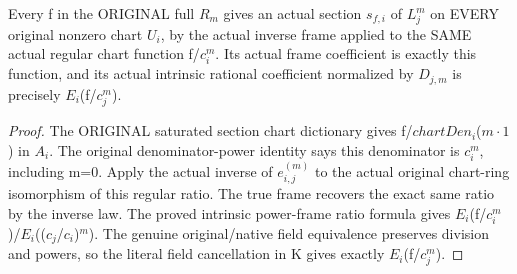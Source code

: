 \begin{lemma}
\label{lem:seven-native-original-tensor-local-sections}
\leanok
Every f in the ORIGINAL full $R_m$ gives an actual section $s_{f,i}$ of $L_j^m$
on EVERY original nonzero chart $U_i$, by the actual inverse frame applied to
the SAME actual regular chart function f/$c_i^m$. Its actual frame coefficient
is exactly this function, and its actual intrinsic rational coefficient
normalized by $D_{j,m}$ is precisely $E_i$(f/$c_j^m$).
\end{lemma}
\begin{proof}
The ORIGINAL saturated section chart dictionary gives f/$chartDen_i$($m\cdot1$)
in $A_i$. The original denominator-power identity says this denominator is
$c_i^m$, including m=0. Apply the actual inverse of $e_{i,j}^{(m)}$ to the actual
original chart-ring isomorphism of this regular ratio. The true frame
recovers the exact same ratio by the inverse law. The proved intrinsic
power-frame ratio formula gives $E_i$(f/$c_i^m$)/$E_i$(($c_j$/$c_i$)$^m$). The genuine
original/native field equivalence preserves division and powers, so the
literal field cancellation in K gives exactly $E_i$(f/$c_j^m$).
\end{proof}

